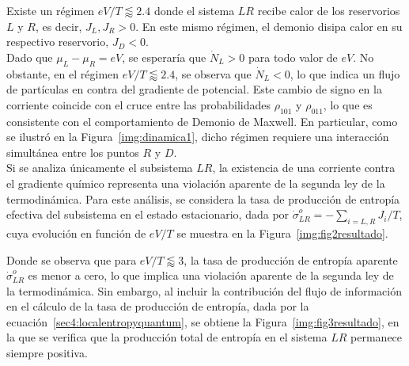 Existe un régimen \( eV/T \lessapprox 2.4 \) donde el sistema \( LR \) recibe calor de los reservorios \( L \) y \( R \), es decir, \( J_L, J_R > 0 \). En este mismo régimen, el demonio disipa calor en su respectivo reservorio, \( J_D < 0 \). 
\\

Dado que $\mu_L - \mu_R = eV$, se esperaría que $\dot{N}_L > 0$ para todo valor de $eV$. No obstante, en el régimen $eV/T \lessapprox 2.4$, se observa que $\dot{N}_L < 0$, lo que indica un flujo de partículas en contra del gradiente de potencial. Este cambio de signo en la corriente coincide con el cruce entre las probabilidades $\rho_{101}$ y $\rho_{011}$, lo que es consistente con el comportamiento de Demonio de Maxwell. En particular, como se ilustró en la Figura~\ref{img:dinamica1}, dicho régimen requiere una interacción simultánea entre los puntos $R$ y $D$.
\\

Si se analiza únicamente el subsistema $LR$, la existencia de una corriente contra el gradiente químico representa una violación aparente de la segunda ley de la termodinámica. Para este análisis, se considera la tasa de producción de entropía efectiva del subsistema en el estado estacionario, dada por $\dot{\sigma}^{o}_{LR} = - \sum_{i=L,R} J_i/T$, cuya evolución en función de $eV/T$ se muestra en la Figura~\ref{img:fig2resultado}.




Donde se observa que para $eV/T \lessapprox 3$, la tasa de producción de entropía aparente $\dot{\sigma}^{o}_{LR}$ es menor a cero, lo que implica una violación aparente de la segunda ley de la termodinámica. Sin embargo, al incluir la contribución del flujo de información en el cálculo de la tasa de producción de entropía, dada por la ecuación~\eqref{sec4:localentropyquantum}, se obtiene la Figura~\ref{img:fig3resultado}, en la que se verifica que la producción total de entropía en el sistema $LR$ permanece siempre positiva.



